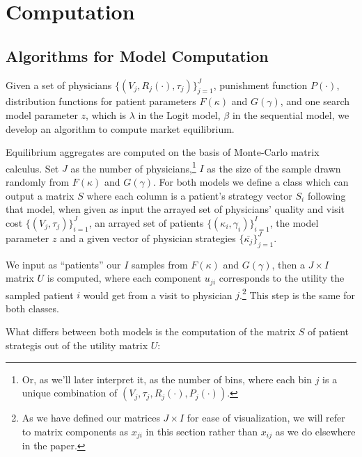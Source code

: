 \documentclass[../main.tex]{subfiles}
\begin{document}
\section{Computation}

\subsection{Algorithms for Model Computation}

Given a set of physicians $\{(V_j, R_j(\cdot), \tau_j)\}_{j =1}^{J}$, punishment function $P(\cdot)$, distribution functions for patient parameters $F(\kappa)$ and $G(\gamma)$, and one search model parameter $z$, which is $\lambda$ in the Logit model, $\beta$ in the sequential model, we develop an algorithm to compute market equilibrium.

Equilibrium aggregates are computed on the basis of Monte-Carlo matrix calculus. Set $J$ as the number of physicians,\footnote{Or, as we'll later interpret it, as the number of bins, where each bin $j$ is a unique combination of $ (V_j, \tau_j, R_j(\cdot),P_j(\cdot))$.} $I$ as the size of the sample drawn randomly from $F(\kappa)$ and $G(\gamma)$. For both models we define a class which can output a matrix $S$ where each column is a patient's strategy vector $S_i$ following that model, when given as input the arrayed set of physicians' quality and visit cost $\{(V_j, \tau_j)\}_{i =1}^{J}$, an arrayed set of patients $\{(\kappa_i,\gamma_i)\}_{i =1}^{I}$, the model parameter $z$ and a given vector of physician strategies $\{\bar{\kappa_j}\}_{j =1}^{J}$.

We input as ``patients'' our $I$ samples from $F(\kappa)$ and $G(\gamma)$, then a $J \times I$ matrix $U$ is computed, where each component $u_{ji}$ corresponds to the utility the sampled patient $i$ would get from a visit to physician $j$.\footnote{As we have defined our matrices $J \times I$ for ease of visualization, we will refer to matrix components as $x_{ji}$ in this section rather than $x_{ij}$ as we do elsewhere in the paper.} This step is the same for both classes.

What differs between both models is the computation of the matrix $S$ of patient strategis out of the utility matrix $U$:
\end{document}
